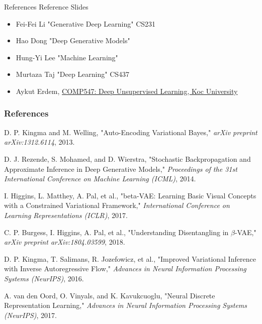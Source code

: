 \begin{frame}[allowframebreaks]{References}
    Reference Slides
\begin{itemize}
    \item Fei-Fei Li "Generative Deep Learning" CS231
    \item Hao Dong "Deep Generative Models" 
    \item Hung-Yi Lee "Machine Learning" 
    \item Murtaza Taj "Deep Learning" CS437
    \item Aykut Erdem, \href{https://aykuterdem.github.io/classes/comp547.s24/}{COMP547: Deep Unsupervised Learning, Koc University}

\end{itemize}

\framebreak
    \frametitle{References}
    \begin{thebibliography}{99}
        D. P. Kingma and M. Welling,
        \newblock "Auto-Encoding Variational Bayes,"
        \newblock \emph{arXiv preprint arXiv:1312.6114}, 2013.

        D. J. Rezende, S. Mohamed, and D. Wierstra,
        \newblock "Stochastic Backpropagation and Approximate Inference in Deep Generative Models,"
        \newblock \emph{Proceedings of the 31st International Conference on Machine Learning (ICML)}, 2014.

        I. Higgins, L. Matthey, A. Pal, et al.,
        \newblock "beta-VAE: Learning Basic Visual Concepts with a Constrained Variational Framework,"
        \newblock \emph{International Conference on Learning Representations (ICLR)}, 2017.

        C. P. Burgess, I. Higgins, A. Pal, et al.,
        \newblock "Understanding Disentangling in $\beta$-VAE,"
        \newblock \emph{arXiv preprint arXiv:1804.03599}, 2018.

        D. P. Kingma, T. Salimans, R. Jozefowicz, et al.,
        \newblock "Improved Variational Inference with Inverse Autoregressive Flow,"
        \newblock \emph{Advances in Neural Information Processing Systems (NeurIPS)}, 2016.

        A. van den Oord, O. Vinyals, and K. Kavukcuoglu,
        \newblock "Neural Discrete Representation Learning,"
        \newblock \emph{Advances in Neural Information Processing Systems (NeurIPS)}, 2017.


\end{thebibliography}
\end{frame}
